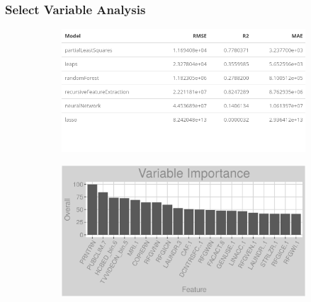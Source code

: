 \subsubsection{Select Variable Analysis}
\label{appendix:electricity:sva}
\begin{figure}[h]
\centering
\begin{subfigure}{0.8\textwidth}
\centering
\includegraphics[width=.99\textwidth, height=0.25\textheight]{Images/electricity_fe_summary.png}
\end{subfigure}
\begin{subfigure}{1\textwidth}
\centering
\includegraphics[width=.99\textwidth, height=0.5\textheight]{Images/electricity_all_vars.png}
\end{subfigure}
\end{figure}
\newpage
